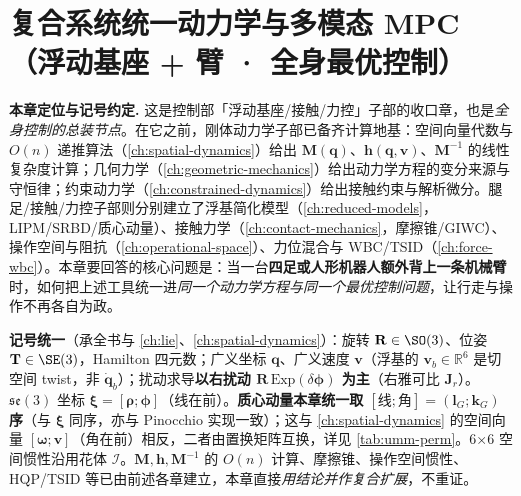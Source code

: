 \chapter{复合系统统一动力学与多模态 MPC（浮动基座 + 臂 · 全身最优控制）}
\label{ch:unified-multimodal-mpc}


\begin{note}
\textbf{本章定位与记号约定.}\;
这是控制部「浮动基座/接触/力控」子部的收口章，也是\emph{全身控制的总装节点}。在它之前，刚体动力学子部已备齐计算地基：空间向量代数与 $O(n)$ 递推算法（\cref{ch:spatial-dynamics}）给出 $\mathbf M(\mathbf q)$、$\mathbf h(\mathbf q,\mathbf v)$、$\mathbf M^{-1}$ 的线性复杂度计算；几何力学（\cref{ch:geometric-mechanics}）给出动力学方程的变分来源与守恒律；约束动力学（\cref{ch:constrained-dynamics}）给出接触约束与解析微分。腿足/接触/力控子部则分别建立了浮基简化模型（\cref{ch:reduced-models}，LIPM/SRBD/质心动量）、接触力学（\cref{ch:contact-mechanics}，摩擦锥/GIWC）、操作空间与阻抗（\cref{ch:operational-space}）、力位混合与 WBC/TSID（\cref{ch:force-wbc}）。本章要回答的核心问题是：当一台\textbf{四足或人形机器人额外背上一条机械臂}时，如何把上述工具统一进\emph{同一个动力学方程与同一个最优控制问题}，让行走与操作不再各自为政。

\textbf{记号统一}（承全书与 \cref{ch:lie}、\cref{ch:spatial-dynamics}）：旋转 $\mathbf R\in\SO(3)$、位姿 $\mathbf T\in\SE(3)$，Hamilton 四元数；广义坐标 $\mathbf q$、广义速度 $\mathbf v$（浮基的 $\mathbf v_b\in\mathbb R^6$ 是切空间 twist，非 $\dot{\mathbf q}_b$）；扰动求导\textbf{以右扰动 $\mathbf R\,\mathrm{Exp}(\delta\boldsymbol\phi)$ 为主}（右雅可比 $\mathbf J_r$）。$\mathfrak{se}(3)$ 坐标 $\boldsymbol\xi=[\boldsymbol\rho;\boldsymbol\phi]$（线在前）。\textbf{质心动量本章统一取 $[\text{线};\text{角}]=(\mathbf l_G;\mathbf k_G)$ 序}（与 $\boldsymbol\xi$ 同序，亦与 Pinocchio 实现一致）；这与 \cref{ch:spatial-dynamics} 的空间向量 $[\boldsymbol\omega;\mathbf v]$（角在前）相反，二者由置换矩阵互换，详见 \cref{tab:umm-perm}。6×6 空间惯性沿用花体 $\mathcal I$。$\mathbf M,\mathbf h,\mathbf M^{-1}$ 的 $O(n)$ 计算、摩擦锥、操作空间惯性、HQP/TSID 等已由前述各章建立，本章直接\emph{用结论并作复合扩展}，不重证。
\end{note}


